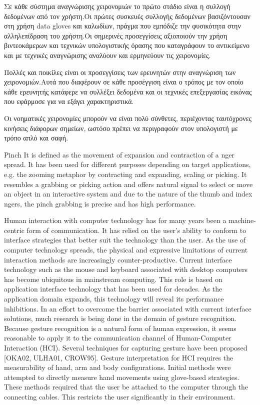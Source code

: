 Σε κάθε σύστημα αναγνώρισης χειρονομιών το πρώτο στάδιο είναι η συλλογή δεδομένων από τον χρήστη.Οι πρώτες συσκευές συλλογής δεδομένων βασιζόντουσαν στη χρήση data gloves και καλωδίων, πράγμα που εμπόδιζε την φυσικότητα στην αλληλεπίδραση του χρήστη.Οι σημερινές προσεγγίσεις αξιοποιούν την χρήση βιντεοκάμερων και τεχνικών υπολογιστικής όρασης που καταγράφουν το αντικείμενο και με τεχνικές αναγνώρισης αναλύουν και ερμηνεύουν τις χειρονομίες.

Πολλές και ποικίλες είναι οι προσεγγίσεις των ερευνητών στην αναγνώριση των χειρονομιών.Αυτά που διαφέρουν σε κάθε προσέγγιση είναι ο τρόπος με τον οποίο κάθε ερευνητής κατάφερε να συλλέξει δεδομένα και οι τεχνικές επεξεργασίας εικόνας που εφάρμοσε για να εξάγει χαρακτηριστικά.

Οι νοηματικές χειρονομίες μπορούν να είναι πολύ σύνθετες, περιέχοντας ταυτόχρονες κινήσεις διάφορων σημείων, ωστόσο πρέπει να περιγραφούν στον υπολογιστή με τρόπο απλό και σαφή.

Pinch It is defined as the movement of expansion and contraction of a nger spread. It has been used for different purposes depending on target applications, e.g. the zooming metaphor by contracting and expanding, scaling or picking. It resembles a grabbing or picking action and offers natural signal to select or move an object in an interactive system and due to the nature of the thumb and index ngers, the pinch grabbing is precise and has high performance.


Human interaction with computer technology has for many years been a machine-centric form of communication. It has relied on the user’s ability to conform to interface strategies that better suit the technology than the user. As the use of computer technology spreads, the physical and expressive limitations of current interaction methods are increasingly counter-productive. Current interface technology such as the mouse and keyboard associated with desktop computers has become ubiquitous in mainstream computing. This role is based on application interface technology that has been used for decades. As the application domain expands, this technology will reveal its performance inhibitions. In an effort to overcome the barrier associated with current interface solutions, much research is being done in the domain of gesture recognition. Because gesture recognition is a natural form of human expression, it seems reasonable to apply it to the communication channel of Human-Computer Interaction (HCI). Several techniques for capturing gesture have been proposed [OKA02, ULHA01, CROW95]. Gesture interpretation for HCI requires the measurability of hand, arm and body configurations. Initial methods were attempted to directly measure hand movements using glove-based strategies. These methods required that the user be attached to the computer through the connecting cables. This restricts the user significantly in their environment.

